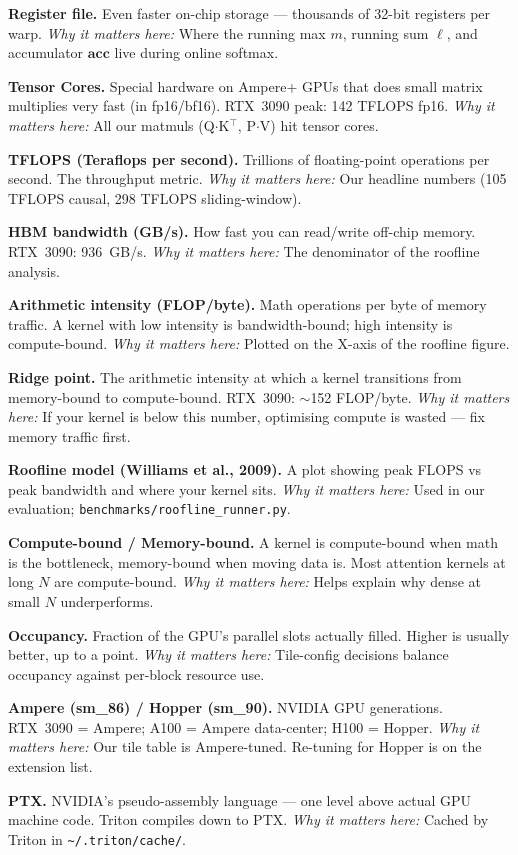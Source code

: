 \documentclass[11pt]{article}
\newcommand{\termw}[3]{%
  \par\smallskip
  \noindent\textbf{\color{blue!50!black}#1.} #2 \emph{\color{black!60}Why it matters here:} #3\par
}
\begin{document}
\termw{Register file}
{Even faster on-chip storage --- thousands of 32-bit registers per warp.}
{Where the running max $m$, running sum $\ell$, and accumulator
$\mathbf{acc}$ live during online softmax.}

\termw{Tensor Cores}
{Special hardware on Ampere+ GPUs that does small matrix multiplies very
fast (in fp16/bf16). RTX~3090 peak: 142 TFLOPS fp16.}
{All our matmuls (Q$\cdot$K$^\top$, P$\cdot$V) hit tensor cores.}

\termw{TFLOPS (Teraflops per second)}
{Trillions of floating-point operations per second. The throughput
metric.}
{Our headline numbers (105 TFLOPS causal, 298 TFLOPS sliding-window).}

\termw{HBM bandwidth (GB/s)}
{How fast you can read/write off-chip memory. RTX~3090: 936~GB/s.}
{The denominator of the roofline analysis.}

\termw{Arithmetic intensity (FLOP/byte)}
{Math operations per byte of memory traffic. A kernel with low intensity
is bandwidth-bound; high intensity is compute-bound.}
{Plotted on the X-axis of the roofline figure.}

\termw{Ridge point}
{The arithmetic intensity at which a kernel transitions from
memory-bound to compute-bound. RTX~3090: $\sim$152 FLOP/byte.}
{If your kernel is below this number, optimising compute is wasted ---
fix memory traffic first.}

\termw{Roofline model (Williams et al., 2009)}
{A plot showing peak FLOPS vs peak bandwidth and where your kernel sits.}
{Used in our evaluation; \texttt{benchmarks/roofline\_runner.py}.}

\termw{Compute-bound / Memory-bound}
{A kernel is compute-bound when math is the bottleneck, memory-bound when
moving data is. Most attention kernels at long $N$ are compute-bound.}
{Helps explain why dense at small $N$ underperforms.}

\termw{Occupancy}
{Fraction of the GPU's parallel slots actually filled. Higher is usually
better, up to a point.}
{Tile-config decisions balance occupancy against per-block resource use.}

\termw{Ampere (sm\_86) / Hopper (sm\_90)}
{NVIDIA GPU generations. RTX~3090 = Ampere; A100 = Ampere data-center;
H100 = Hopper.}
{Our tile table is Ampere-tuned. Re-tuning for Hopper is on the
extension list.}

\termw{PTX}
{NVIDIA's pseudo-assembly language --- one level above actual GPU machine
code. Triton compiles down to PTX.}
{Cached by Triton in \texttt{\textasciitilde/.triton/cache/}.}
\end{document}
